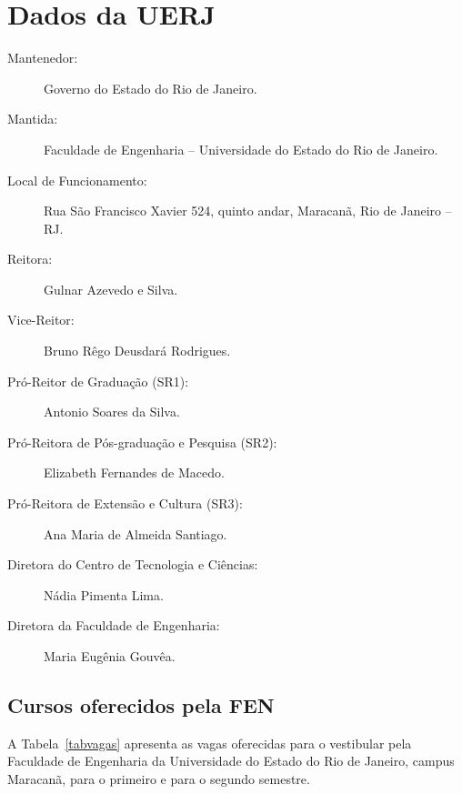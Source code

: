 \chapter{Dados da UERJ}

\begin{description}
	\item[Mantenedor:] Governo do Estado do Rio de Janeiro.
	\item [Mantida:] Faculdade de Engenharia -- Universidade do Estado do Rio de Janeiro.
	\item [Local de Funcionamento:] Rua São Francisco Xavier 524, quinto andar, Maracanã, Rio de Janeiro -- RJ.
	\item [Reitora:] Gulnar Azevedo e Silva.
	\item [Vice-Reitor:] Bruno Rêgo Deusdará Rodrigues.
	\item [Pró-Reitor de Graduação (SR1):] Antonio Soares da Silva.
	\item [Pró-Reitora de Pós-graduação e Pesquisa (SR2):] Elizabeth Fernandes de Macedo.
	\item [Pró-Reitora de Extensão e Cultura (SR3):] Ana Maria de Almeida Santiago.
	\item [Diretora do Centro de Tecnologia e Ciências:] Nádia Pimenta Lima.
	\item [Diretora da Faculdade de Engenharia:]  Maria Eugênia Gouvêa.
\end{description}


\section{Cursos oferecidos pela FEN}
A Tabela~\ref{tabvagas} apresenta as vagas oferecidas para o vestibular pela Faculdade de Engenharia da Universidade do Estado do Rio de Janeiro, campus Maracanã, para o primeiro e para o segundo semestre.
\label{sec:cursosoferecidos}

